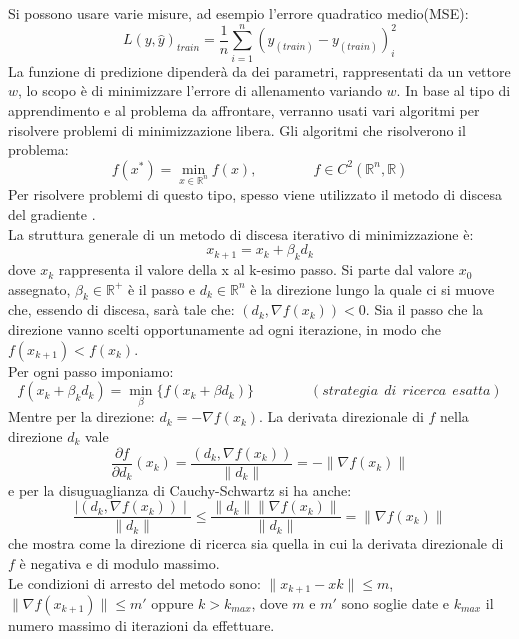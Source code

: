 \documentclass[a4paper,12pt,oneside]{book}
\begin{document}
Si possono usare varie misure, ad esempio l'errore quadratico medio(MSE):
\begin{equation}\label{train-error}
L(y,\hat{y})_{train}=\frac{1}{n}\sum_{i=1}^{n}(\hat{y}_{(train)}-y_{(train)})_{i}^2
\end{equation}
La funzione di predizione dipender\`{a} da dei parametri, rappresentati da un vettore $w$, lo scopo \`e di minimizzare l'errore di allenamento variando $w$.
In base al tipo di apprendimento e al problema da affrontare, verranno usati vari algoritmi per risolvere problemi di minimizzazione libera. Gli algoritmi che risolverono il problema:
\begin{equation}\label{minimi}
f(x^{*})=\min_{x\in \mathbb{R}^{n}}f(x),\qquad \qquad f\in C^{2}(\mathbb{R}^{n},\mathbb{R})
\end{equation}
Per risolvere problemi di questo tipo, spesso viene utilizzato il metodo di discesa del gradiente \cite{an}. \\
La struttura generale di un metodo di discesa iterativo di minimizzazione \`e:
\begin{equation}\label{eq:min}
x_{k+1}=x_{k}+\beta_{k}d_{k}
\end{equation}
dove $x_k$ rappresenta il valore della x al k-esimo passo. Si parte dal valore $x_{0}$ assegnato, $\beta_{k}\in \mathbb{R^{+}}$ \`e il passo e $d_{k}\in \mathbb{R}^{n}$ \`e la direzione lungo la quale ci si muove che, essendo di discesa, sar\`{a} tale che: $(d_{k},\nabla f(x_{k}))<0$. Sia il passo che la direzione vanno scelti opportunamente ad ogni iterazione, in modo che $f(x_{k+1})<f(x_{k})$.\\
Per ogni passo imponiamo:
$$f(x_{k}+\beta_{k}d_{k})=\min_{\beta}\{f(x_{k}+\beta d_{k})\}\qquad \qquad (strategia\: \: di\: \: ricerca\: \: esatta)$$
Mentre per la direzione: $d_{k}=-\nabla f(x_{k})$. La derivata direzionale di $f$ nella direzione $d_{k}$ vale $$\frac{\partial f}{\partial d_{k}}(x_{k})=\frac{(d_{k},\nabla f(x_{k}))}{\parallel d_{k}\parallel}=-\parallel \nabla f(x_{k})\parallel$$ e per la disuguaglianza di Cauchy-Schwartz si ha anche: $$\frac{\mid (d_{k},\nabla f(x_{k}))\mid}{\parallel d_{k}\parallel}\leq \frac{\parallel d_{k} \parallel \parallel \nabla f(x_{k})\parallel}{\parallel d_{k}\parallel}=\parallel \nabla f(x_{k})\parallel$$ che mostra come la direzione di ricerca sia quella in cui la derivata direzionale di $f$ \`e negativa e di modulo massimo.\\
Le condizioni di arresto del metodo sono: $\parallel x_{k+1}-x{k}\parallel \leq m$, $\parallel \nabla f(x_{k+1})\parallel \leq m\prime$ oppure $k>k_{max}$, dove $m$ e $m\prime$ sono soglie date e $k_{max}$ il numero massimo di iterazioni da effettuare.\\
\end{document}
